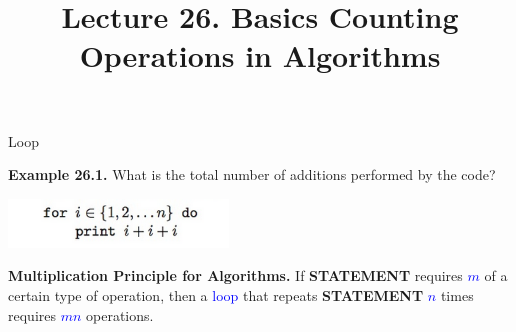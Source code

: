 \documentclass[aspectratio=169]{beamer}
\title{Lecture 26. Basics Counting Operations in Algorithms}
\date{ }
\providecommand{\Blue}[1]{\textcolor{blue}{#1}}
\begin{document}
\frame[plain]{\titlepage}

 


\begin{frame}[plain]{Loop}

	{\bf Example 26.1.} What is the total number of additions performed by the
		code?
		  \begin{center}
		  	\includegraphics[height=1.3cm]{./img/lecture26-fig1.png}
		  \end{center}
   \pause
   
   	
	{\bf Multiplication Principle for Algorithms.} If {\bf STATEMENT} 
		 requires \Blue{$m$} of a certain type 
		of operation, then a \Blue{loop} that repeats {\bf STATEMENT} \Blue{$n$}
		times requires \Blue{$mn$} operations.

	
	\vspace{.5in}
	
\end{frame}


    
	
	
	
\end{document}
